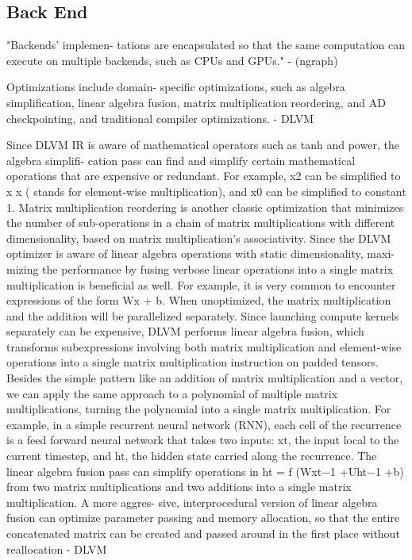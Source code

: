 \subsection{Back End}
"Backends’ implemen-
tations are encapsulated so that the same computation can execute
on multiple backends, such as CPUs and GPUs." - (ngraph)




Optimizations include domain- specific optimizations, such as algebra
simplification, linear algebra fusion, matrix multiplication reordering, and AD
checkpointing, and traditional compiler optimizations. - DLVM 

Since DLVM IR is aware of mathematical operators such as tanh and power, the
algebra simplifi- cation pass can find and simplify certain mathematical
operations that are expensive or redundant.  For example, x2 can be simplified
to x x ( stands for element-wise multiplication), and x0 can be simplified to
constant 1. Matrix multiplication reordering is another classic optimization
that minimizes the number of sub-operations in a chain of matrix
multiplications with different dimensionality, based on matrix multiplication’s
associativity.  Since the DLVM optimizer is aware of linear algebra operations
with static dimensionality, maxi- mizing the performance by fusing verbose
linear operations into a single matrix multiplication is beneficial as well.
For example, it is very common to encounter expressions of the form Wx + b.
When unoptimized, the matrix multiplication and the addition will be
parallelized separately. Since launching compute kernels separately can be
expensive, DLVM performs linear algebra fusion, which transforms subexpressions
involving both matrix multiplication and element-wise operations into a single
matrix multiplication instruction on padded tensors. Besides the simple pattern
like an addition of matrix multiplication and a vector, we can apply the same
approach to a polynomial of multiple matrix multiplications, turning the
polynomial into a single matrix multiplication. For example, in a simple
recurrent neural network (RNN), each cell of the recurrence is a feed forward
neural network that takes two inputs: xt, the input local to the current
timestep, and ht, the hidden state carried along the recurrence. The linear
algebra fusion pass can simplify operations in ht = f (Wxt−1 +Uht−1 +b) from
two matrix multiplications and two additions into a single matrix
multiplication. A more aggres- sive, interprocedural version of linear algebra
fusion can optimize parameter passing and memory allocation, so that the entire
concatenated matrix can be created and passed around in the first place without
reallocation - DLVM


